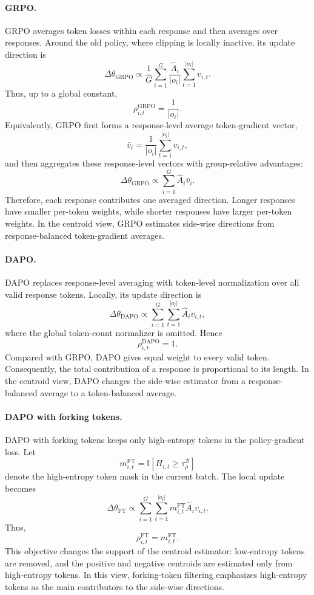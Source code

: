 \documentclass{article} %
\begin{document}
\paragraph{GRPO.}
GRPO averages token losses within each response and then averages over
responses. Around the old policy, where clipping is locally inactive, its update
direction is
\begin{equation}
\label{eq:grpo-local-centroid}
\Delta\theta_{\mathrm{GRPO}}
\propto
\frac{1}{G}
\sum_{i=1}^{G}
\frac{\hat A_i}{|o_i|}
\sum_{t=1}^{|o_i|}
v_{i,t}.
\end{equation}
Thus, up to a global constant,
\[
\rho_{i,t}^{\mathrm{GRPO}}=\frac{1}{|o_i|}.
\]
Equivalently, GRPO first forms a response-level average token-gradient vector,
\[
\bar v_i
=
\frac{1}{|o_i|}
\sum_{t=1}^{|o_i|}
v_{i,t},
\]
and then aggregates these response-level vectors with group-relative advantages:
\[
\Delta\theta_{\mathrm{GRPO}}
\propto
\sum_{i=1}^{G}\hat A_i \bar v_i.
\]
Therefore, each response contributes one averaged direction. Longer responses
have smaller per-token weights, while shorter responses have larger per-token
weights. In the centroid view, GRPO estimates side-wise directions from
response-balanced token-gradient averages.

\paragraph{DAPO.}
DAPO replaces response-level averaging with token-level normalization over all
valid response tokens. Locally, its update direction is
\begin{equation}
\label{eq:dapo-local-centroid}
\Delta\theta_{\mathrm{DAPO}}
\propto
\sum_{i=1}^{G}
\sum_{t=1}^{|o_i|}
\hat A_i v_{i,t},
\end{equation}
where the global token-count normalizer is omitted. Hence
\[
\rho_{i,t}^{\mathrm{DAPO}}=1.
\]
Compared with GRPO, DAPO gives equal weight to every valid token. Consequently,
the total contribution of a response is proportional to its length. In the
centroid view, DAPO changes the side-wise estimator from a response-balanced
average to a token-balanced average.

\paragraph{DAPO with forking tokens.}
DAPO with forking tokens keeps only high-entropy tokens in the policy-gradient
loss. Let
\[
m_{i,t}^{\mathrm{FT}}
=
\mathbb{I}\!\left[H_{i,t}\ge \tau_\rho^{\mathcal B}\right]
\]
denote the high-entropy token mask in the current batch. The local update becomes
\begin{equation}
\label{eq:ft-local-centroid}
\Delta\theta_{\mathrm{FT}}
\propto
\sum_{i=1}^{G}
\sum_{t=1}^{|o_i|}
m_{i,t}^{\mathrm{FT}}\hat A_i v_{i,t}.
\end{equation}
Thus,
\[
\rho_{i,t}^{\mathrm{FT}}=m_{i,t}^{\mathrm{FT}}.
\]
This objective changes the support of the centroid estimator: low-entropy tokens
are removed, and the positive and negative centroids are estimated only from
high-entropy tokens. In this view, forking-token filtering emphasizes
high-entropy tokens as the main contributors to the side-wise directions.
\end{document}
